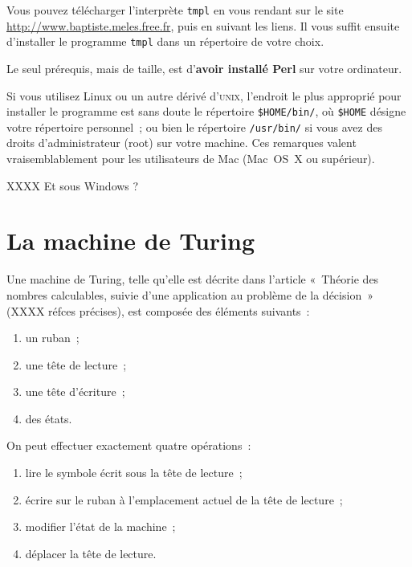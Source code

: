 \documentclass[a4paper, 11pt]{report}
\begin{document}
Vous pouvez télécharger l'interprète \texttt{tmpl} en vous rendant sur
le site \url{http://www.baptiste.meles.free.fr}, puis en suivant les
liens. Il vous suffit ensuite d'installer le programme \texttt{tmpl}
dans un répertoire de votre choix.

\par

Le seul prérequis, mais de taille, est d'\textbf{avoir installé Perl}
sur votre ordinateur.

\par

Si vous utilisez Linux ou un autre dérivé d'\textsc{unix}, l'endroit le
plus approprié pour installer le programme est sans doute le répertoire
\texttt{\$HOME/bin/}, où \texttt{\$HOME} désigne votre répertoire
personnel~; ou bien le répertoire \texttt{/usr/bin/} si vous avez des
droits d'administrateur (root) sur votre machine. Ces remarques valent
vraisemblablement pour les utilisateurs de Mac (Mac~OS~X ou supérieur).

\par

XXXX Et sous Windows ?



\chapter{La machine de Turing}


Une machine de Turing, telle qu'elle est décrite dans l'article
«~Théorie des nombres calculables, suivie d'une application au problème
de la décision~» (XXXX réfces précises), est composée des éléments
suivants~:


\begin{enumerate}
\item un ruban~; 
\item une tête de lecture~; 
\item une tête d'écriture~;
\item des états.
\end{enumerate}

\par

On peut effectuer exactement quatre opérations~:

\begin{enumerate}
\item lire le symbole écrit sous la tête de lecture~;
\item écrire sur le ruban à l'emplacement actuel de la tête de lecture~;
\item modifier l'état de la machine~;
\item déplacer la tête de lecture.
\end{enumerate}
\end{document}
